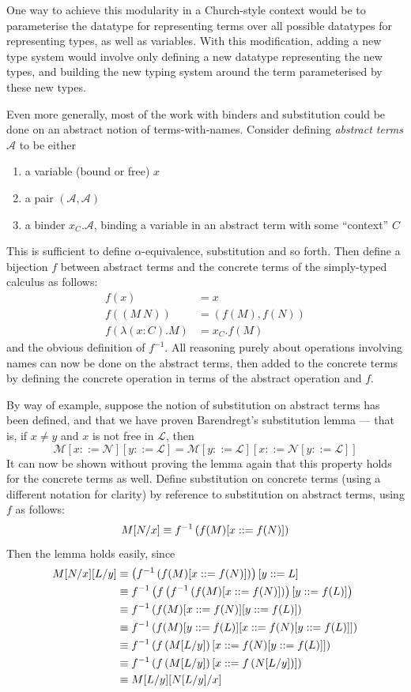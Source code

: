 One way to achieve this modularity in a Church-style context would be to parameterise the datatype for representing terms over all possible datatypes for representing types, as well as variables.
With this modification, adding a new type system would involve only defining a new datatype representing the new types, and building the new typing system around the term parameterised by these new types.

Even more generally, most of the work with binders and substitution could be done on an abstract notion of terms-with-names.
Consider defining \emph{abstract terms} \(\mathcal A\) to be either
\begin{enumerate}
\item a variable (bound or free) \(x\)
\item a pair \((\mathcal A, \mathcal A)\)
\item a binder \(x_C.\mathcal A\), binding a variable in an abstract term with some ``context'' \(C\)
\end{enumerate}
This is sufficient to define \(\alpha\)-equivalence, substitution and so forth.
Then define a bijection \(f\) between abstract terms and the concrete terms of the simply-typed calculus as follows:
\begin{align*}
f(x) &= x\\
f((M\ N)) &= (f(M), f(N))\\
f(\lambda (x : C). M) &= x_C.f(M)
\end{align*}
and the obvious definition of \(f^{-1}\).
All reasoning purely about operations involving names can now be done on the abstract terms, then added to the concrete terms by defining the concrete operation in terms of the abstract operation and \(f\).

By way of example, suppose the notion of substitution on abstract terms has been defined, and that we have proven Barendregt's substitution lemma --- that is, if \(x \neq y\) and \(x\) is not free in \(\mathcal L\), then
\[
\mathcal M[x ::= \mathcal N][y ::= \mathcal L] = \mathcal M[y ::= \mathcal L][x ::= \mathcal N[y ::= \mathcal L]]
\]
It can now be shown without proving the lemma again that this property holds for the concrete terms as well.
Define substitution on concrete terms (using a different notation for clarity) by reference to substitution on abstract terms, using \(f\) as follows:
\[
M[N/x] \equiv f^{-1}\left(f(M)[x ::= f(N)]\right)
\]
Then the lemma holds easily, since
\begin{align*}
M[N/x][L/y]
	&\equiv \left(f^{-1}\left(f(M)[x ::= f(N)]\right)\right)[y ::= L]\\
	&\equiv f^{-1}\left(f\left(f^{-1}\left(f(M)[x ::= f(N)]\right)\right)[y ::= f(L)]\right)\\
	&\equiv f^{-1}\left(f(M)[x ::= f(N)][y ::= f(L)]\right)\\
	&\equiv f^{-1}\left(f(M)[y ::= f(L)][x ::= f(N)[y ::= f(L)]]\right)\\
	&\equiv f^{-1}\left(f\left(M[L/y]\right)[x ::= f(N)[y ::= f(L)]]\right)\\
	&\equiv f^{-1}\left(f\left(M[L/y]\right)[x ::= f\left(N[L/y]\right)]\right)\\
	&\equiv M[L/y][N[L/y]/x]
\end{align*}

